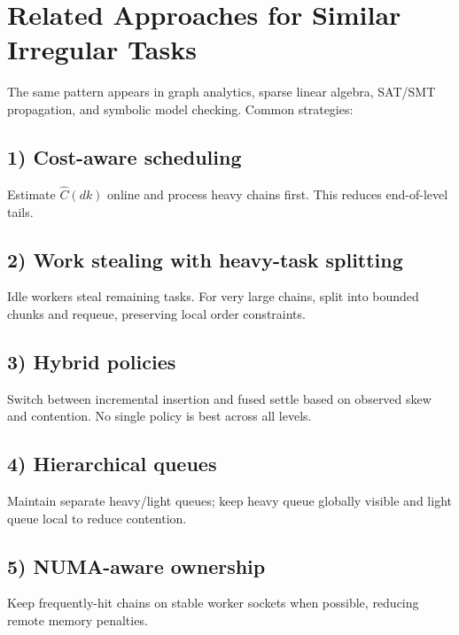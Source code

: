 \section{Related Approaches for Similar Irregular Tasks}
The same pattern appears in graph analytics, sparse linear algebra, SAT/SMT propagation, and symbolic model checking.
Common strategies:

\subsection*{1) Cost-aware scheduling}
Estimate $\hat C(dk)$ online and process heavy chains first.
This reduces end-of-level tails.

\subsection*{2) Work stealing with heavy-task splitting}
Idle workers steal remaining tasks.
For very large chains, split into bounded chunks and requeue, preserving local order constraints.

\subsection*{3) Hybrid policies}
Switch between incremental insertion and fused settle based on observed skew and contention.
No single policy is best across all levels.

\subsection*{4) Hierarchical queues}
Maintain separate heavy/light queues; keep heavy queue globally visible and light queue local to reduce contention.

\subsection*{5) NUMA-aware ownership}
Keep frequently-hit chains on stable worker sockets when possible, reducing remote memory penalties.
